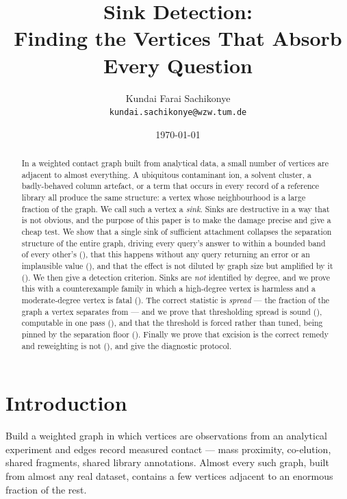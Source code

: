 \documentclass[11pt,a4paper]{article}
\title{\textbf{Sink Detection:\\[2pt]
Finding the Vertices That Absorb Every Question}}
\author{Kundai Farai Sachikonye\\
\texttt{kundai.sachikonye@wzw.tum.de}}
\date{\today}
\theoremstyle{definition}
\theoremstyle{remark}
\begin{document}
\maketitle

\begin{abstract}
\noindent
In a weighted contact graph built from analytical data, a small number of
vertices are adjacent to almost everything. A ubiquitous contaminant ion,
a solvent cluster, a badly-behaved column artefact, or a term that occurs
in every record of a reference library all produce the same structure:
a vertex whose neighbourhood is a large fraction of the graph. We call
such a vertex a \emph{sink}. Sinks are destructive in a way that is not
obvious, and the purpose of this paper is to make the damage precise and
give a cheap test. We show that a single sink of sufficient attachment
collapses the separation structure of the entire graph, driving every
query's answer to within a bounded band of every other's
(), that this happens without any query returning an
error or an implausible value (), and that the effect is
not diluted by graph size but amplified by it (). We
then give a detection criterion. Sinks are \emph{not} identified by
degree, and we prove this with a counterexample family in which a
high-degree vertex is harmless and a moderate-degree vertex is fatal
(). The correct statistic is \emph{spread} --- the
fraction of the graph a vertex separates from --- and we prove that
thresholding spread is sound (), computable in one
pass (), and that the threshold is forced rather
than tuned, being pinned by the separation floor
(). Finally we prove that excision is the correct
remedy and reweighting is not (), and give the
diagnostic protocol.
\end{abstract}

\section{Introduction}
\label{sec:intro}

Build a weighted graph in which vertices are observations from an
analytical experiment and edges record measured contact --- mass
proximity, co-elution, shared fragments, shared library annotations.
Almost every such graph, built from almost any real dataset, contains a
few vertices adjacent to an enormous fraction of the rest.
\end{document}
